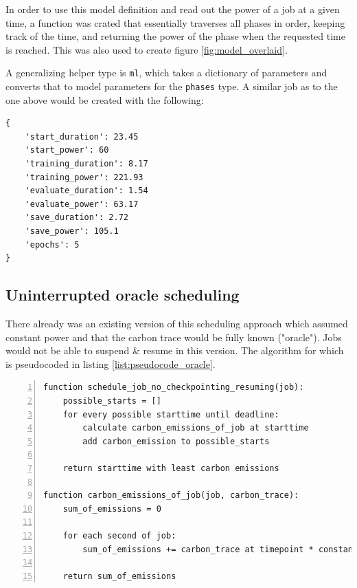 In order to use this model definition and read out the power of a job at a given time, a function was crated that essentially traverses all phases in order, keeping track of the time, and returning the power of the phase when the requested time is reached. 
This was also used to create figure \ref{fig:model_overlaid}.

A generalizing helper type is \verb|ml|, which takes a dictionary of parameters and converts that to model parameters for the \verb|phases| type. A similar job as to the one above would be created with the following:

\begin{lstlisting}[frame=single, numbers=none, caption={Generic model definition for machine learning jobs}, label={list:roberta_model_definition_generic}, basicstyle=\ttfamily]
{
    'start_duration': 23.45
    'start_power': 60
    'training_duration': 8.17
    'training_power': 221.93
    'evaluate_duration': 1.54
    'evaluate_power': 63.17
    'save_duration': 2.72
    'save_power': 105.1
    'epochs': 5
}
\end{lstlisting}

\subsection{Uninterrupted oracle scheduling} \label{sec:uninterrupted_oracle_scheduling}

There already was an existing version of this scheduling approach which assumed constant power and that the carbon trace would be fully known ("oracle"). 
Jobs would not be able to suspend \& resume in this version.
The algorithm for which is pseudocoded in listing \ref{list:pseudocode_oracle}.

\begin{lstlisting}[frame=single, numbers=left, caption={Pseudocode for the original non-interrupt oracle scheduler}, label={list:pseudocode_oracle}, basicstyle=\ttfamily]
function schedule_job_no_checkpointing_resuming(job):
    possible_starts = []
    for every possible starttime until deadline:
        calculate carbon_emissions_of_job at starttime
        add carbon_emission to possible_starts
    
    return starttime with least carbon emissions

function carbon_emissions_of_job(job, carbon_trace):
    sum_of_emissions = 0

    for each second of job:
        sum_of_emissions += carbon_trace at timepoint * constant_watt
    
    return sum_of_emissions
\end{lstlisting}

